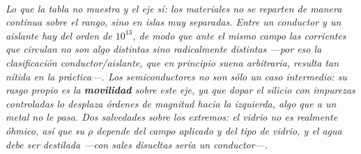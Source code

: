 \begin{center}
\\[0.5em]
{\small\itshape Lo que la tabla no muestra y el eje sí: los materiales no se
reparten de manera continua sobre el rango, sino en islas muy separadas. Entre
un conductor y un aislante hay del orden de $10^{13}$, de modo que ante el mismo
campo las corrientes que circulan no son \emph{algo} distintas sino
radicalmente distintas ---por eso la clasificación conductor/aislante, que en
principio suena arbitraria, resulta tan nítida en la práctica---. Los
semiconductores no son sólo un caso intermedio: su rasgo propio es la
\textbf{movilidad} sobre este eje, ya que dopar el silicio con impurezas
controladas lo desplaza órdenes de magnitud hacia la izquierda, algo que a un
metal no le pasa. Dos salvedades sobre los extremos: el vidrio no es realmente
óhmico, así que su $\rho$ depende del campo aplicado y del tipo de vidrio, y el
agua debe ser destilada ---con sales disueltas sería un conductor---.}
\end{center}
